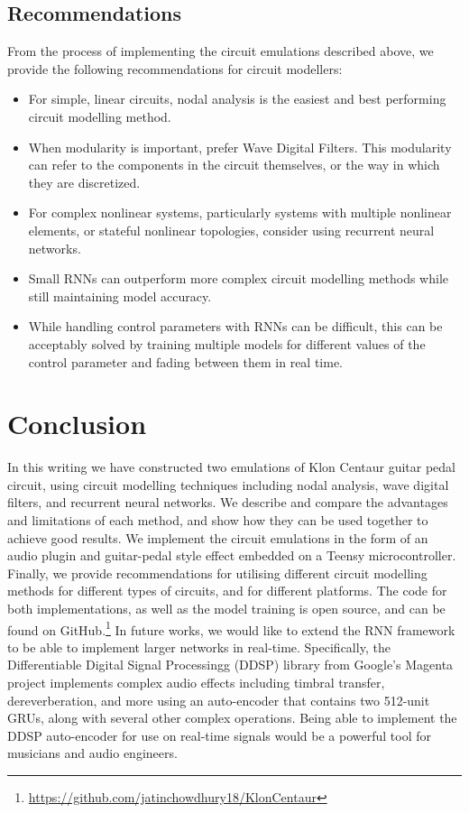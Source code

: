 \documentclass[twoside,a4paper]{article}
\begin{document}
\subsection{Recommendations}
From the process of implementing the circuit emulations described
above, we provide the following recommendations for circuit modellers:
\begin{itemize}
    \item For simple, linear circuits, nodal analysis is the easiest
          and best performing circuit modelling method.
    \item When modularity is important, prefer Wave Digital Filters.
          This modularity can refer to the components in the circuit
          themselves, or the way in which they are discretized.
    \item For complex nonlinear systems, particularly systems with
          multiple nonlinear elements, or stateful nonlinear topologies,
          consider using recurrent neural networks.
    \item Small RNNs can outperform more complex circuit modelling methods
          while still maintaining model accuracy.
    \item While handling control parameters with RNNs can be difficult,
          this can be acceptably solved by training multiple models for
          different values of the control parameter and fading between them
          in real time.
\end{itemize}

\section{Conclusion}
In this writing we have constructed two emulations of Klon
Centaur guitar pedal circuit, using circuit modelling techniques
including nodal analysis, wave digital filters, and recurrent
neural networks. We describe and compare the advantages and
limitations of each method, and show how they can be used together
to achieve good results. We implement the circuit emulations in the
form of an audio plugin and guitar-pedal style effect embedded on
a Teensy microcontroller. Finally, we provide recommendations for
utilising different circuit modelling methods for different types
of circuits, and for different platforms. The code for both
implementations, as well as the model training is open source,
and can be found on GitHub.\footnote{\url{https://github.com/jatinchowdhury18/KlonCentaur}}
\newline\newline
In future works, we would like to extend the RNN framework to be able
to implement larger networks in real-time. Specifically, the Differentiable
Digital Signal Processingg (DDSP) library from Google's Magenta project
\cite{engel2020ddsp} implements complex audio effects including timbral
transfer, dereverberation, and more using an auto-encoder that contains
two 512-unit GRUs, along with several other complex operations. Being
able to implement the DDSP auto-encoder for use on real-time signals
would be a powerful tool for musicians and audio engineers.
\end{document}
